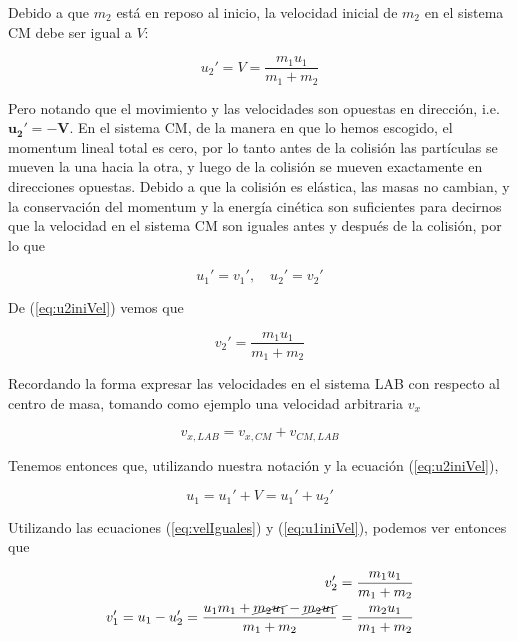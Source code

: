 \documentclass[a4paper,10pt]{article}
\begin{document}
Debido a que $m_2$ está en reposo al inicio, la velocidad inicial de $m_2$ en el sistema
CM debe ser igual a $V$:

\begin{equation}
u_2'= V = \frac{m_1 u_1}{m_1+m_2}
 \label{eq:u2iniVel}
 \end{equation}
  
Pero notando que el movimiento y las velocidades son opuestas en dirección, i.e. $\mathbf{u_2'=-\mathbf{V}}$.
En el sistema CM, de la manera en que lo hemos escogido, el momentum lineal total es cero, por lo tanto
antes de la colisión las partículas se mueven la una hacia la otra, y luego de la colisión
se mueven exactamente en direcciones opuestas. Debido a que la colisión es elástica,
las masas no cambian, y la conservación del momentum y la energía cinética son suficientes
para decirnos que la velocidad en el sistema CM son iguales antes y después de la colisión,
por lo que 

\begin{equation}
 u_1'=v_1', \quad u_2'=v_2'
 \label{eq:velIguales}
\end{equation}

De (\ref{eq:u2iniVel}) vemos que 

\begin{equation}
v_2'= \frac{m_1 u_1}{m_1+m_2}
 \label{eq:u2finalVel} 
\end{equation}

Recordando la forma expresar las velocidades en el sistema LAB con respecto al centro de masa,
tomando como ejemplo una velocidad arbitraria $v_x$

$$
v_{x,LAB} = v_{x,CM} + v_{CM,LAB}
$$

Tenemos entonces que, utilizando nuestra notación y la ecuación (\ref{eq:u2iniVel}),

\begin{equation}
 u_1 = u_1' + V = u_1' + u_2'
 \label{eq:u1iniVel}
\end{equation}

Utilizando las ecuaciones (\ref{eq:velIguales}) y (\ref{eq:u1iniVel}), podemos ver entonces que 

 \begin{gather}
 \begin{split}
   v_2' = \frac{m_1 u_1}{m_1 + m_2} \\
   v_1' = u_1 - u_2' = \frac{u_1 m_1 + \cancel{m_2 u_1} - \cancel{m_2 u_1}}{m_1 + m_2} =
   \frac{m_2 u_1}{m_1 + m_2}\\
 \end{split}
 \end{gather}
\end{document}
